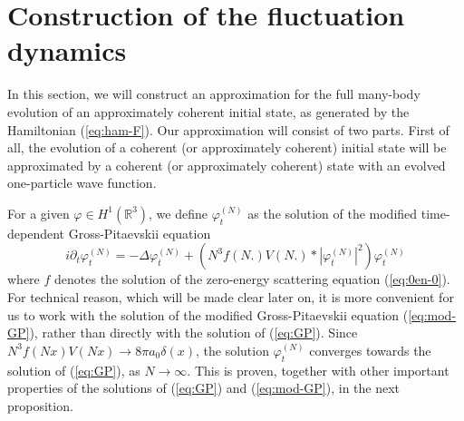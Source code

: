 \documentclass[11pt,a4paper]{article}
\newcommand{\done}{}
\newcommand{\bR}{{\mathbb R}}
\begin{document}
\section{Construction of the fluctuation dynamics}

In this section, we will construct an approximation for the full many-body evolution of an approximately coherent initial state, as generated by the Hamiltonian (\ref{eq:ham-F}). Our approximation will consist 
of two parts. First of all, the evolution of a coherent (or approximately coherent) initial state will be approximated by a coherent (or approximately coherent) state\done{} with an evolved one-particle wave function. 

For a given $\varphi \in H^1 (\bR^3)$, we define $\varphi^{(N)}_t$ as the solution of the modified time-dependent Gross-Pitaevskii equation
\begin{equation}\label{eq:mod-GP} i\partial_t \varphi_t^{(N)} = - \Delta \varphi_t^{(N)} + \left( N^3 f(N.) V(N.) * |\varphi^{(N)}_t|^2 \right) \varphi_t^{(N)} \end{equation}
where $f$ denotes the solution of the zero-energy scattering equation (\ref{eq:0en-0}). 
For technical reason, which will be made clear later on, it is more convenient for us to work with the solution of the modified Gross-Pitaevskii equation (\ref{eq:mod-GP}), rather than directly with the solution of (\ref{eq:GP}). Since $N^3 f(Nx) V(Nx) \to 8 \pi a_0 \delta (x)$, the solution $\varphi_t^{(N)}$ converges towards the solution of (\ref{eq:GP}), as $N \to \infty$. This is proven, together with other important properties of the solutions of (\ref{eq:GP}) and (\ref{eq:mod-GP}), in the next proposition. 
\end{document}
